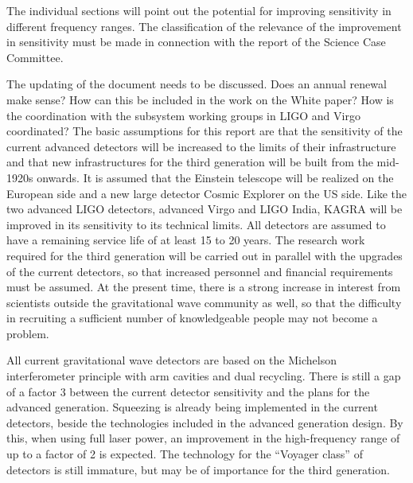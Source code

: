 The individual sections will point out the potential for improving sensitivity in different frequency ranges. The classification of the relevance of the improvement in sensitivity must be made in connection with the report of the Science Case Committee. 
\par
The updating of the document needs to be discussed. Does an annual renewal make sense? How can this be included in the work on the White paper? How is the coordination with the subsystem working groups in LIGO and Virgo coordinated? The basic assumptions for this report are that the sensitivity of the current advanced detectors will be increased to the limits of their infrastructure and that new infrastructures for the third generation will be built from the mid-1920s onwards. It is assumed that the Einstein telescope will be realized on the European side and a new large detector Cosmic Explorer on the US side. Like the two advanced LIGO detectors, advanced Virgo and LIGO India, KAGRA will be improved in its sensitivity to its technical limits. All detectors are assumed to have a remaining service life of at least 15 to 20 years. The research work required for the third generation will be carried out in parallel with the upgrades of the current detectors, so that increased personnel and financial requirements must be assumed. At the present time, there is a strong increase in interest from scientists outside the gravitational wave community as well, so that the difficulty in recruiting a sufficient number of knowledgeable people may not become a problem.

All current gravitational wave detectors are based on the Michelson interferometer principle with arm cavities and dual recycling.
There is still a gap of a factor 3 between the current detector sensitivity and the plans for the advanced generation. Squeezing is already being implemented in the current detectors, beside the technologies included in the advanced generation design. By this, when using full laser power, an improvement in the high-frequency range of up to a factor of 2 is expected. 
The technology for the “Voyager class” of detectors is still immature, but may be of importance for the third generation.

